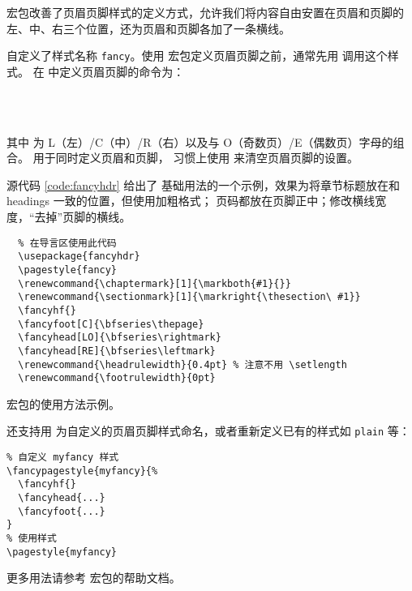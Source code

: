  宏包改善了页眉页脚样式的定义方式，允许我们将内容自由安置在页眉和页脚的左、中、右三个位置，还为页眉和页脚各加了一条横线。

 自定义了样式名称 \texttt{fancy}。使用  宏包定义页眉页脚之前，通常先用  调用这个样式。
在  中定义页眉页脚的命令为：
\begin{command}
\marg*{\ldots}\\
\marg*{\ldots}\\
\marg*{\ldots}
\end{command}
其中  为 L（左）/C（中）/R（右）以及与 O（奇数页）/E（偶数页）字母的组合。 用于同时定义页眉和页脚，
习惯上使用 \marg*{} 来清空页眉页脚的设置。

源代码 \ref{code:fancyhdr} 给出了  基础用法的一个示例，效果为将章节标题放在和 headings 一致的位置，但使用加粗格式；
页码都放在页脚正中；修改横线宽度，“去掉”页脚的横线。

\begin{sourcecode}[htp]
  \begin{Verbatim}
  % 在导言区使用此代码
  \usepackage{fancyhdr}
  \pagestyle{fancy}
  \renewcommand{\chaptermark}[1]{\markboth{#1}{}}
  \renewcommand{\sectionmark}[1]{\markright{\thesection\ #1}}
  \fancyhf{}
  \fancyfoot[C]{\bfseries\thepage}
  \fancyhead[LO]{\bfseries\rightmark}
  \fancyhead[RE]{\bfseries\leftmark}
  \renewcommand{\headrulewidth}{0.4pt} % 注意不用 \setlength
  \renewcommand{\footrulewidth}{0pt}
  \end{Verbatim}
  \caption{ 宏包的使用方法示例。}\label{code:fancyhdr}
\end{sourcecode}

 还支持用  为自定义的页眉页脚样式命名，或者重新定义已有的样式如 \texttt{plain} 等：
\begin{verbatim}
% 自定义 myfancy 样式
\fancypagestyle{myfancy}{%
  \fancyhf{}
  \fancyhead{...}
  \fancyfoot{...}
}
% 使用样式
\pagestyle{myfancy}
\end{verbatim}

更多用法请参考  宏包的帮助文档。


\endinput

